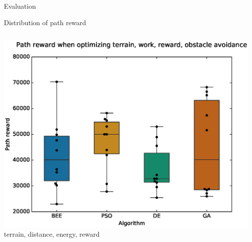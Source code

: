 \documentclass[9pt]{beamer}
\begin{document}
\begin{frame}{Evaluation}
\begin{block}{Distribution of path reward}
\begin{columns}
\begin{column}{0.5\textwidth}
\begin{center}
                    \includegraphics[width=\textwidth,trim={.75cm .75cm 0cm 1cm},clip]{img/EXP3_histo_reward_b.eps}
                    \linebreak
                    terrain, distance, energy, reward
                \end{center}
            \end{column}
        \end{columns}
    \end{block}
\end{frame}
\end{document}
